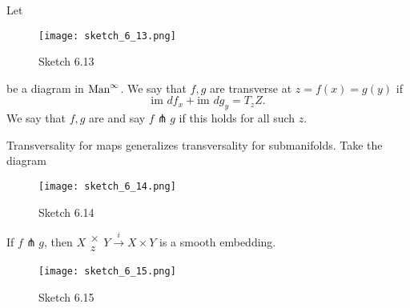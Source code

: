 \begin{definition*}
    Let \begin{figure}[H]
        \centering
        \texttt{[image: sketch\_6\_13.png]}
        \caption{Sketch 6.13}
    \end{figure}
    be a diagram in \(\text{Man}^\infty\). We say that \(f,g\) are transverse at \(z=f(x)=g(y)\) if 
    \[\text{im }df_x+\text{im }dg_y=T_zZ.\]
    We say that \(f,g\) are  and say \(f\pitchfork g\) if this holds 
    for all such \(z\).
\end{definition*}

\begin{remark}
    Transversality for maps generalizes transversality for submanifolds. Take the diagram 
    \begin{figure}[H]
        \centering
        \texttt{[image: sketch\_6\_14.png]}
        \caption{Sketch 6.14}
    \end{figure}
\end{remark}

\begin{proposition}\label{prop:6.2}
    If \(f\pitchfork g\), then \(X\substack{\times\\z} Y \stackrel{i}{\to} X\times Y\) is a smooth embedding.
\end{proposition}

\begin{figure}[H]
    \centering
    \texttt{[image: sketch\_6\_15.png]}
    \caption{Sketch 6.15}
\end{figure}

